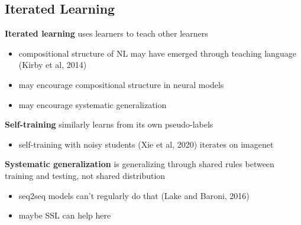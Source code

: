 \documentclass[]{article}
\theoremstyle{definition}
\begin{document}
    \subsection{Iterated Learning}%
    \label{sub:iterated_learning}

    \textbf{Iterated learning} uses learners to teach other learners
    \begin{itemize}
        \item compositional structure of NL may have emerged through teaching language (Kirby et al, 2014)
        \item may encourage compositional structure in neural models
        \item may encourage systematic generalization
    \end{itemize}

    \textbf{Self-training} similarly learns from its own pseudo-labels
    \begin{itemize}
        \item self-training with noisy students (Xie et al, 2020) iterates on imagenet
    \end{itemize}

    \textbf{Systematic generalization} is generalizing through shared rules between training and testing, not shared distribution
    \begin{itemize}
        \item seq2seq models can't regularly do that (Lake and Baroni, 2016)
        \item maybe SSL can help here
    \end{itemize}
\end{document}
